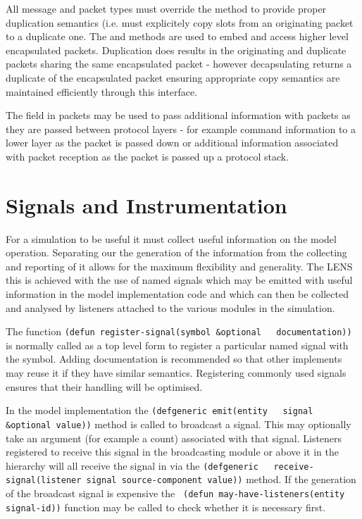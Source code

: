 \documentclass[a4paper,11pt,twoside,openany]{report}
\newcommand{\acr}[1]{\acrshort{#1}}
\begin{document}
All message and packet types must override the  method
to provide proper duplication semantics (i.e. must explicitely copy
slots from an originating packet to a duplicate one. The
 and  methods are used to embed and
access higher level encapsulated packets. Duplication does results in
the originating and duplicate packets sharing the same encapsulated
packet - however decapsulating returns a duplicate of the encapsulated
packet ensuring appropriate copy semantics are maintained
efficiently through this interface.

The  field in packets may be used to pass additional
information with packets as they are passed between protocol layers -
for example command information to a lower layer as the packet is
passed down or additional information associated with packet reception
as the packet is passed up a protocol stack.

\chapter{Signals and Instrumentation}

For a simulation to be useful it must collect useful information on
the model operation. Separating our the generation of the information
from the collecting and reporting of it allows for the maximum
flexibility and generality. The \acr{LENS} this is achieved with the use
of named signals which may be emitted with useful information in the
model implementation code and which can then be collected and analysed
by listeners attached to the various modules in the simulation.

The function \lstinline{(defun register-signal(symbol &optional
  documentation))} is normally called as a top level form to register a
particular named signal with the symbol. Adding documentation is
recommended so that other implements may reuse it if they have similar
semantics. Registering commonly used signals ensures that their
handling will be optimised.

In the model implementation the \lstinline{(defgeneric emit(entity
  signal &optional value))} method is called to broadcast a
signal. This may optionally take an argument (for example a count)
associated with that signal. Listeners registered to receive this
signal in the broadcasting module or above it in the hierarchy will
all receive the signal in via the \lstinline{(defgeneric
  receive-signal(listener signal source-component value))} method.
If the generation of the broadcast signal is expensive the \lstinline{
(defun may-have-listeners(entity signal-id))} function may be called to
check whether it is necessary first.
\end{document}
